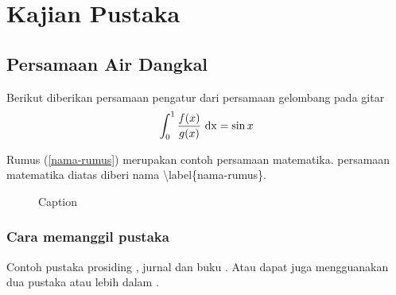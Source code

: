\chapter{Kajian Pustaka}
\section{Persamaan Air Dangkal}
Berikut diberikan persamaan pengatur dari persamaan gelombang pada gitar
\begin{equation}\label{nama-rumus}
    \int_0^1 \frac{f(x)}{g(x)}\ {\rm dx}=\sin x
\end{equation}

Rumus (\ref{nama-rumus}) merupakan contoh persamaan matematika. persamaan matematika diatas diberi nama \textbackslash label\{nama-rumus\}.

\begin{figure}[h!]
    \centering
    \caption{Caption}
    \label{fig:my_label}
\end{figure}
\subsection{Cara memanggil pustaka}
Contoh pustaka prosiding \cite{doyen2014explicit}, jurnal \cite{gunawan2015hydrostatic} dan buku \cite{toro2013riemann}. Atau dapat juga mengguanakan dua pustaka atau lebih dalam \cite{gunawan2015hydrostatic,toro2013riemann}.